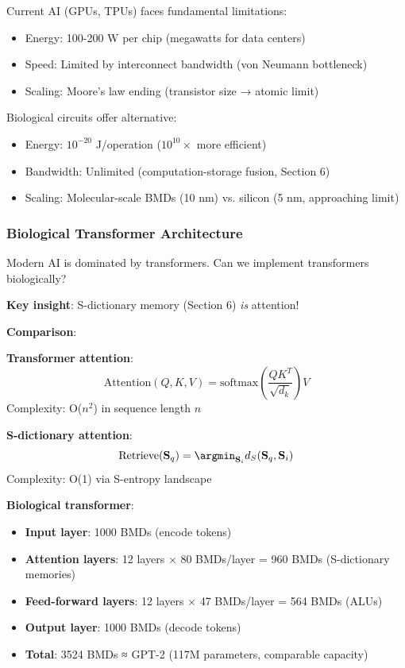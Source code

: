 \documentclass[11pt,a4paper]{article}
\begin{document}
Current AI (GPUs, TPUs) faces fundamental limitations:
\begin{itemize}
\item Energy: 100-200 W per chip (megawatts for data centers)
\item Speed: Limited by interconnect bandwidth (von Neumann bottleneck)
\item Scaling: Moore's law ending (transistor size → atomic limit)
\end{itemize}

Biological circuits offer alternative:
\begin{itemize}
\item Energy: $10^{-20}$ J/operation ($10^{10}\times$ more efficient)
\item Bandwidth: Unlimited (computation-storage fusion, Section 6)
\item Scaling: Molecular-scale BMDs (10 nm) vs. silicon (5 nm, approaching limit)
\end{itemize}

\subsubsection{Biological Transformer Architecture}

Modern AI is dominated by transformers\cite{vaswani2017attention}. Can we implement transformers biologically?

\textbf{Key insight}: S-dictionary memory (Section 6) \textit{is} attention!

\textbf{Comparison}:

\textbf{Transformer attention}:
\begin{equation}
\text{Attention}(Q, K, V) = \text{softmax}\left(\frac{QK^T}{\sqrt{d_k}}\right)V
\end{equation}
Complexity: O($n^2$) in sequence length $n$

\textbf{S-dictionary attention}:
\begin{equation}
\text{Retrieve}(\mathbf{S}_q) = \argmin_{\mathbf{S}_i} d_S(\mathbf{S}_q, \mathbf{S}_i)
\end{equation}
Complexity: O(1) via S-entropy landscape

\textbf{Biological transformer}:
\begin{itemize}
\item \textbf{Input layer}: 1000 BMDs (encode tokens)
\item \textbf{Attention layers}: 12 layers $\times$ 80 BMDs/layer = 960 BMDs (S-dictionary memories)
\item \textbf{Feed-forward layers}: 12 layers $\times$ 47 BMDs/layer = 564 BMDs (ALUs)
\item \textbf{Output layer}: 1000 BMDs (decode tokens)
\item \textbf{Total}: 3524 BMDs ≈ GPT-2 (117M parameters, comparable capacity)
\end{itemize}
\end{document}

